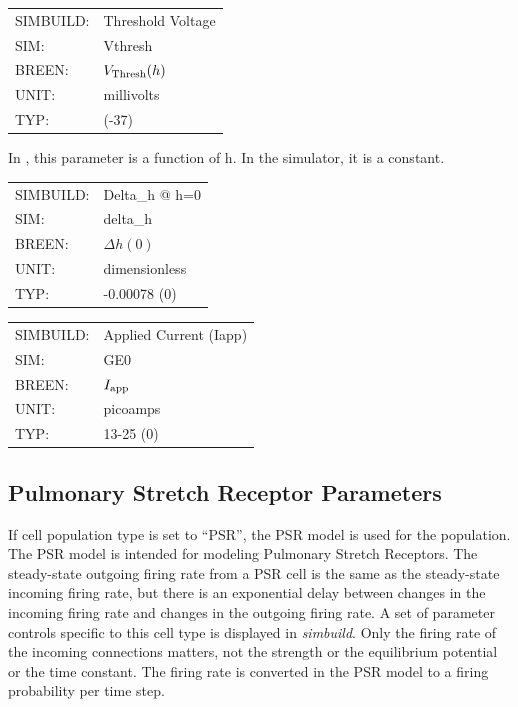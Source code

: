 \documentclass[12pt,openany,oneside]{book}
\newcommand{\prog}[1]{\textit{{#1}}}
\newcommand{\inquotes}[1]{{{``#1''}}}
\begin{document}
\begin{flushleft}
\begin{tabular}{@{}ll@{}}
SIMBUILD: & Threshold Voltage\\
SIM: & Vthresh\\
BREEN: & $V_{\rm Thresh}(h)$\\
UNIT: & millivolts\\
TYP: & (-37)\\
\end{tabular}
\end{flushleft}
\noindent In \citet {breenhybrid2003}, this parameter is 
a function of h. In the simulator, it is a constant.
\filbreak
\vspace{2\baselineskip}

\begin{flushleft}
\begin{tabular}{@{}ll@{}}
SIMBUILD: & Delta\_h @ h=0\\
SIM: & delta\_h\\
BREEN: & $\Delta h(0)$\\
UNIT: & dimensionless\\
TYP: & -0.00078 (0)\\
\end{tabular}
\end{flushleft}
\noindent
\filbreak
\vspace{\baselineskip}

\begin{flushleft}
\begin{tabular}{@{}ll@{}}
SIMBUILD: & Applied Current (Iapp)\\
SIM: & GE0\\
BREEN: & $I_{\rm app}$\\
UNIT: & picoamps\\
TYP: & 13-25 (0)\\
\end{tabular}
\end{flushleft}
\noindent
\filbreak
\vspace{\baselineskip}

\subsection{Pulmonary Stretch Receptor Parameters}
\label{PSR Parameters}
If cell population type is set to \inquotes{PSR}, the PSR 
model is used for the population.  The PSR model is
intended for modeling Pulmonary Stretch Receptors. The steady-state
outgoing firing rate from a PSR cell is the same as the steady-state
incoming firing rate, but there is an exponential delay between
changes in the incoming firing rate and changes in the outgoing firing
rate.  A set of parameter controls specific to this cell type is displayed
in \prog{simbuild}.  Only the firing rate of the incoming connections matters, not
the strength or the equilibrium potential or the time constant. The
firing rate is converted in the PSR model to a firing probability per
time step.
\end{document}
